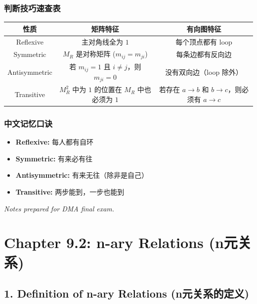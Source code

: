 \documentclass[10pt,a4paper,openany]{ctexbook}
\theoremstyle{definition}
\theoremstyle{remark}
\begin{document}
\subsubsection{判断技巧速查表}

\begin{center}
\begin{tabular}{ccc}
\hline
性质 & 矩阵特征 & 有向图特征 \\ \hline
Reflexive & 主对角线全为 $1$ & 每个顶点都有 loop \\
Symmetric & $M_R$ 是对称矩阵 ($m_{ij} = m_{ji}$) & 每条边都有反向边 \\
Antisymmetric & 若 $m_{ij}=1$ 且 $i \neq j$，则 $m_{ji}=0$ & 没有双向边（loop 除外） \\
Transitive & $M_R^2$ 中为 $1$ 的位置在 $M_R$ 中也必须为 $1$ & 若存在 $a \to b$ 和 $b \to c$，则必须有 $a \to c$ \\
\hline
\end{tabular}

\end{center}

\subsubsection{中文记忆口诀}

\begin{itemize}
\item \textbf{Reflexive:} 每人都有自环
\item \textbf{Symmetric:} 有来必有往
\item \textbf{Antisymmetric:} 有来无往（除非是自己）
\item \textbf{Transitive:} 两步能到，一步也能到

\end{itemize}

\vspace{-2pt}

\textit{Notes prepared for DMA final exam.}

\newpage

\section{Chapter 9.2: n-ary Relations (n元关系)}

\vspace{-2pt}

\subsection{1. Definition of n-ary Relations (n元关系的定义)}
\end{document}
